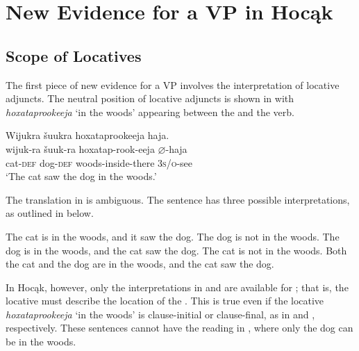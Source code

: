\documentclass[output=paper]{LSP/langsci}
\begin{document}
\section{New Evidence for a VP in Hocąk}\label{sec:jrs:4}

\subsection{Scope of Locatives}

The first piece of new evidence for a VP involves the interpretation of locative adjuncts. The neutral position of locative adjuncts is shown in  with \textit{hoxataprookeeja} `in the woods' appearing between the  and the verb.

\begin{exe}
\ex\label{ex:jrs:37} 
\glll Wijukra	\v{s}uukra		hoxataprookeeja		haja.\\
wijuk-ra	\v{s}uuk-ra		hoxatap-rook-eeja		$\varnothing$-haja \\
cat-\textsc{def}		dog-\textsc{def} 	woods-inside-there	\textsc{3s/o}-see \\
\trans `The cat saw the dog in the woods.' 
\end{exe}

The translation in  is ambiguous. The  sentence has three possible interpretations, as outlined in  below.

\begin{exe}
\ex\label{ex:jrs:38} 
\begin{xlist}
\ex \label{ex:jrs:38a} The cat is in the woods, and it saw the dog. The dog is not in the woods. 
\ex \label{ex:jrs:38b} The dog is in the woods, and the cat saw the dog. The cat is not in the woods.
\ex \label{ex:jrs:38c}Both the cat and the dog are in the woods, and the cat saw the dog.
\end{xlist}
\end{exe}

 
In Hocąk, however, only the interpretations in  and  are available for ; that is, the locative  must describe the location of the . This is true even if the locative \textit{hoxataprookeeja} `in the woods' is clause-initial or clause-final, as in  and  , respectively. These sentences cannot have the reading in , where only the dog can be in the woods.
 
\end{document}
